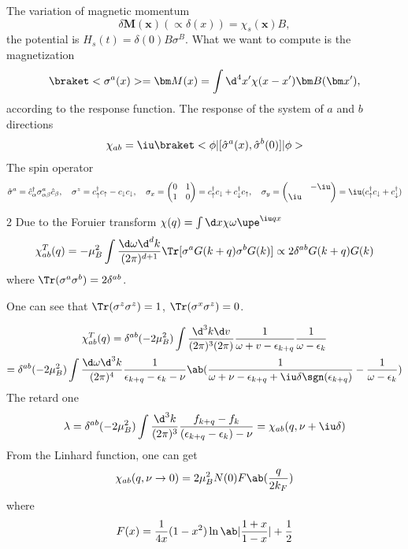 The variation of magnetic momentum
\[
  \delta\bm M(\bm x) (\propto\delta(x)) = \chi_s(\bm x) B,
\]
the potential is $H_s(t) = \delta(0) B \sigma^B$.
What we want to compute is the magnetization
\[
  \braket<\sigma^a(x)> = \bm M(x) = \int \d^4 x' \chi(x - x') \bm B(\bm x'),
\]
according to the response function.
The response of the system of $a$ and $b$ directions
\[
  \chi_{ab} = \iu\braket<\phi|[\hat\sigma^a(x), \hat\sigma^b(0)]|\phi>
\]
The spin operator
\[
  \hat \sigma^a = \hat c_\alpha^\dagger \sigma_{\alpha\beta}^a \hat c_\beta,
  \quad
  \sigma^z = c_\uparrow^\dagger c_\uparrow - c_\downarrow c_\downarrow, \quad
  \sigma_x = \begin{pmatrix}
    0 & 1\\1 & 0
  \end{pmatrix}
= c_\uparrow^\dagger c_\downarrow + c_\downarrow^\dagger c_\uparrow, \quad
  \sigma_y = \begin{pmatrix}
    & -\iu\\\iu
  \end{pmatrix}
= \iu(c_\uparrow^\dagger c_\downarrow + c_\downarrow^\dagger )
\]
\begin{paracol}{2}
Due to the Foruier transform $\chi(q) = \int \d x \chi\omega \upe^{\iu qx}$
\[
  \chi_{ab}^T(q) = -\mu_B^2 \int \frac{\d \omega \d^d k}{(2\pi)^{d+1}}
    \Tr[\sigma^a G(k + q) \sigma^b G(k)] \propto 2\delta^{ab} G(k + q) G(k)
\]
where $\Tr(\sigma^a\sigma^b) = 2\delta^{ab}$.

One can see that $\Tr(\sigma^z \sigma^z) = 1$, $\Tr(\sigma^x\sigma^z) = 0$.
\switchcolumn \centering
{}
\end{paracol}
\begin{multline*}
  \chi_{ab}^T(q) = \delta^{ab}(-2\mu_B^2)
  \int \frac{\d^3k\d v}{(2\pi)^3(2\pi)}
  \frac{1}{\omega + v -\epsilon_{k+q}}
  \frac{1}{\omega - \epsilon_k}\\
= \delta^{ab} (-2\mu_B^2) \int \frac{\d\omega \d^3k}{(2\pi)^4}
  \frac1{\epsilon_{k+q} - \epsilon_k - \nu}
  \ab(
    \frac{1}{\omega + \nu - \epsilon_{k+q} + \iu\delta\sgn(\epsilon_{k+q})}
  - \frac{1}{\omega - \epsilon_k})
\end{multline*}
The retard one
\[
  \lambda = \delta^{ab}(-2\mu_B^2) \int \frac{\d^3k}{(2\pi)^3}
  \frac{f_{k+q} - f_k}{(\epsilon_{k+q} - \epsilon_k) - \nu}
= \chi_{ab}(q, \nu + \iu\delta)
\]
From the Linhard function, one can get
\[
  \chi_{ab}(q, \nu \to 0)
= 2\mu_B^2 N(0) F\ab(\frac{q}{2k_F})
\]
where
\[
  F(x) = \frac1{4x}(1 - x^2)
  \ln\ab|\frac{1 + x}{1 - x}| + \frac12
\]

